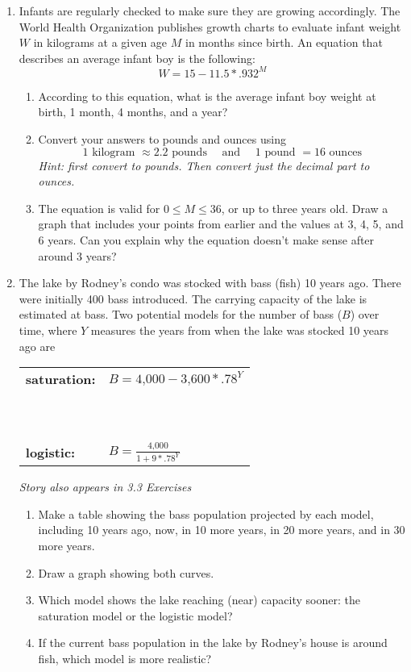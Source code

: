 \begin{enumerate}
\item Infants are regularly checked to make sure they are growing accordingly.  The World Health Organization publishes growth charts to evaluate infant weight $W$ in kilograms at a given age $M$ in months since birth.  An equation that describes an average infant boy is the following:
$$W=15-11.5\ast.932^M$$
\begin{enumerate}
\item According to this equation, what is the average infant boy weight at birth, 1 month, 4 months, and a year?
\item Convert your answers to pounds and ounces using $$1 \text{ kilogram } \approx 2.2 \text{ pounds} \quad \text{ and } \quad 1 \text{ pound } = 16 \text{ ounces}$$
\emph{Hint:  first convert to pounds.  Then convert just the decimal part to ounces.}
\item The equation is valid for $0 \le M \le 36$, or up to three years old.  Draw a graph that includes your points from earlier and the values at 3, 4, 5, and 6 years.  Can you explain why the equation doesn't make sense after around 3 years?
\end{enumerate}  

\item The lake by Rodney's condo was stocked with bass (fish) 10 years ago.  There were initially 400 bass introduced.  The carrying capacity of the lake is estimated at  bass.  Two potential models for the number of bass ($B$) over time, where $Y$ measures the years from when the lake was stocked 10 years ago are

\vspace{.05in} %
\begin{center}
\begin{tabular} {ll} 
 \textbf{saturation:} & $B=\text{4,000}-\text{3,600}\ast.78^Y$ \\ 
 \begin{tiny} ~ \end{tiny} \\
 \textbf{logistic:} & $\displaystyle B=\frac{\text{4,000}}{1+9 \ast .78^Y}$ \\
\end{tabular}
\end{center} 
\vspace{.05in} %

\hfill \emph{Story also appears in 3.3 Exercises}

\begin{enumerate}
\item Make a table showing the bass population projected by each model, including 10 years ago, now, in 10 more years, in 20 more years, and in 30 more years.
\item Draw a graph showing both curves.
\item Which model shows the lake reaching (near) capacity sooner:  the saturation model or the logistic model?
\item If the current bass population in the lake by Rodney's house is around  fish, which model is more realistic?
\end{enumerate}


\end{enumerate}




